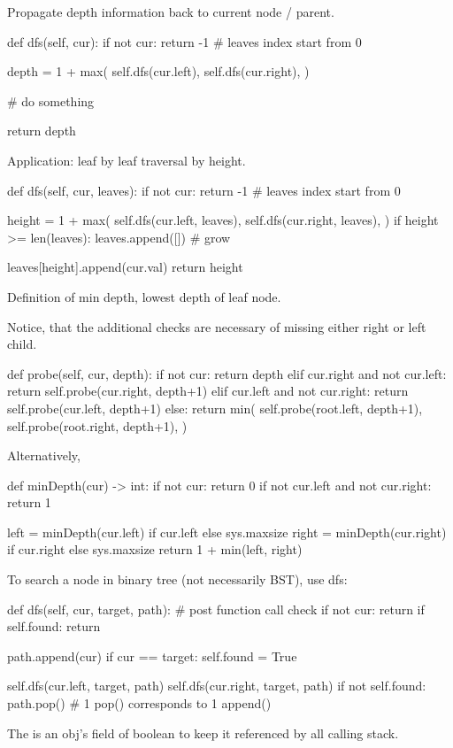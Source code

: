  Propagate depth information back to current node / parent. 

\begin{python}
def dfs(self, cur):
    if not cur:
        return -1  # leaves index start from 0

    depth = 1 + max(
        self.dfs(cur.left), 
        self.dfs(cur.right),
    )
    
    # do something
     
    return depth
\end{python}

Application: leaf by leaf traversal by height. 
\begin{python}
def dfs(self, cur, leaves):
    if not cur:
        return -1  # leaves index start from 0

    height = 1 + max(
        self.dfs(cur.left, leaves), 
        self.dfs(cur.right, leaves),
    )
    if height >= len(leaves):
        leaves.append([])  # grow

    leaves[height].append(cur.val)
    return height
\end{python}

 Definition of min depth, lowest depth of leaf node. 

Notice, that the additional checks are necessary of missing either right or left child.
\begin{python}
def probe(self, cur, depth):
    if not cur: 
        return depth
    elif cur.right and not cur.left: 
        return self.probe(cur.right, depth+1)
    elif cur.left and not cur.right: 
        return self.probe(cur.left, depth+1)
    else: 
        return min(
            self.probe(root.left, depth+1), 
            self.probe(root.right, depth+1),
        )
\end{python}
Alternatively,
\begin{python}
def minDepth(cur) -> int:
  if not cur:
    return 0  
  if not cur.left and not cur.right:
    return 1

  left = minDepth(cur.left) if cur.left else sys.maxsize
  right = minDepth(cur.right) if cur.right else sys.maxsize
  return 1 + min(left, right)
\end{python}
 To search a node in binary tree (not necessarily BST), use dfs:
\begin{python}
def dfs(self, cur, target, path):
    # post function call check
    if not cur:
      return        
    if self.found:
      return 

    path.append(cur)
    if cur == target:
        self.found = True

    self.dfs(cur.left, target, path)
    self.dfs(cur.right, target, path)
    if not self.found:
        path.pop()  # 1 pop() corresponds to 1 append()
\end{python}
The  is an obj's field of boolean to keep it referenced by all calling stack. 

